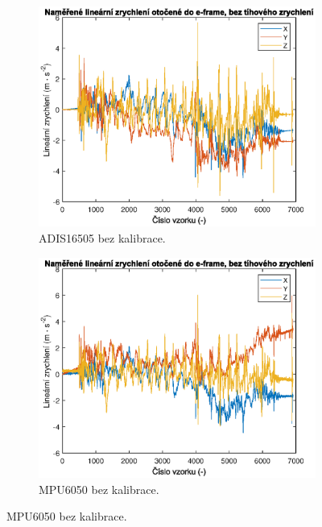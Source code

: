\begin{figure}[h]
     \centering
     \begin{subfigure}[b]{0.49\textwidth}
         \centering
         \includegraphics[width=\textwidth]{obrazky/matlab/1adisNoCal}
         \caption{ADIS16505 bez kalibrace.}   
         \label{fig:adisNoCal}  
     \end{subfigure}
     \hfill
     \centering
     \begin{subfigure}[b]{0.49\textwidth}
         \centering
         \includegraphics[width=\textwidth]{obrazky/matlab/1mpuNoCal}
         \caption{MPU6050 bez kalibrace.}   
         \label{fig:mpuNoCal}  
     \end{subfigure}
     

\end{figure}

